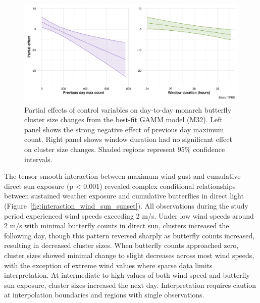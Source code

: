 \begin{figure}[htbp]
    \centering
    \includegraphics[width=\textwidth]{supplemental/results/sunset/figures/partial_effects_best_1x2.png}
    \caption{Partial effects of control variables on day-to-day monarch butterfly cluster size changes from the best-fit GAMM model (M32). Left panel shows the strong negative effect of previous day maximum count. Right panel shows window duration had no significant effect on cluster size changes. Shaded regions represent 95\% confidence intervals.}
    \label{fig:partial_effects_sunset}
\end{figure}

The tensor smooth interaction between maximum wind gust and cumulative direct sun exposure (p < 0.001) revealed complex conditional relationships between sustained weather exposure and cumulative butterflies in direct light (Figure~\ref{fig:interaction_wind_sun_sunset}). All observations during the study period experienced wind speeds exceeding 2 m/s. Under low wind speeds around 2 m/s with minimal butterfly counts in direct sun, clusters increased the following day, though this pattern reversed sharply as butterfly counts increased, resulting in decreased cluster sizes. When butterfly counts approached zero, cluster sizes showed minimal change to slight decreases across most wind speeds, with the exception of extreme wind values where sparse data limits interpretation. At intermediate to high values of both wind speed and butterfly sun exposure, cluster sizes increased the next day. Interpretation requires caution at interpolation boundaries and regions with single observations. 

